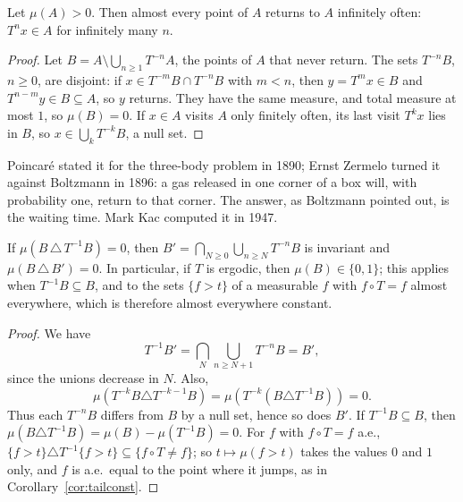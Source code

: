 \begin{theorem}\label{thm:poincare}
Let $\mu(A)>0$. Then almost every point of $A$ returns to $A$ infinitely often: $T^nx\in A$ for infinitely many $n$.
\end{theorem}
\begin{proof}
Let $B=A\setminus\bigcup_{n\ge1}T^{-n}A$, the points of $A$ that never return. The sets $T^{-n}B$, $n\ge0$, are disjoint: if $x\in T^{-m}B\cap T^{-n}B$ with $m<n$, then $y=T^mx\in B$ and $T^{n-m}y\in B\subseteq A$, so
$y$ returns. They have the same measure, and total measure at most $1$, so $\mu(B)=0$. If $x\in A$ visits $A$ only finitely often, its last visit $T^kx$ lies in $B$, so $x\in\bigcup_kT^{-k}B$, a null set.
\end{proof}

Poincar\'e stated it for the three-body problem in 1890; Ernst Zermelo turned it against Boltzmann in 1896: a gas released in one corner of a box will, with probability one, return to that corner.
The answer, as Boltzmann pointed out, is the waiting time. Mark Kac computed it in 1947.

\begin{lemma}\label{lem:almostinv}
If $\mu(B\,\triangle\,T^{-1}B)=0$, then $B'=\bigcap_{N\ge0}\bigcup_{n\ge N}T^{-n}B$ is invariant and $\mu(B\,\triangle\,B')=0$. In particular, if $T$ is ergodic, then $\mu(B)\in\{0,1\}$; this applies when
$T^{-1}B\subseteq B$, and to the sets $\{f>t\}$ of a measurable $f$ with $f\circ T=f$ almost everywhere, which is therefore almost everywhere constant.
\end{lemma}
\begin{proof}
We have
\[
T^{-1}B'=\bigcap_N\bigcup_{n\ge N+1}T^{-n}B=B',
\]
since the unions decrease in $N$. Also,
\[
\mu(T^{-k}B\triangle T^{-k-1}B)=\mu(T^{-k}(B\triangle T^{-1}B))=0.
\]
Thus each $T^{-n}B$ differs from $B$ by a null set, hence so does $B'$.
If $T^{-1}B\subseteq B$, then $\mu(B\triangle T^{-1}B)=\mu(B)-\mu(T^{-1}B)=0$. For $f$ with $f\circ T=f$ a.e., $\{f>t\}\triangle T^{-1}\{f>t\}\subseteq\{f\circ T\neq f\}$; so $t\mapsto\mu(f>t)$ takes the values $0$ and $1$ only, and
$f$ is a.e.\ equal to the point where it jumps, as in Corollary~\ref{cor:tailconst}.
\end{proof}

